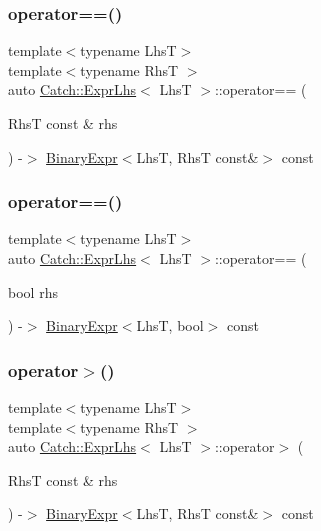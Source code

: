 \subsubsection{\texorpdfstring{operator==()}{operator==()}\hspace{0.1cm}{\footnotesize\ttfamily [1/2]}}
{\footnotesize\ttfamily template$<$typename LhsT$>$ \\
template$<$typename RhsT $>$ \\
auto \mbox{\hyperlink{class_catch_1_1_expr_lhs}{Catch\+::\+Expr\+Lhs}}$<$ LhsT $>$\+::operator== (\begin{DoxyParamCaption}\item[{RhsT const \&}]{rhs }\end{DoxyParamCaption}) -\/$>$ \mbox{\hyperlink{class_catch_1_1_binary_expr}{Binary\+Expr}}$<$LhsT, RhsT const\&$>$ const \hspace{0.3cm}{\ttfamily [inline]}}

\mbox{\label{class_catch_1_1_expr_lhs_ab707a84abdffbdc35962a495e238d393}} 
\subsubsection{\texorpdfstring{operator==()}{operator==()}\hspace{0.1cm}{\footnotesize\ttfamily [2/2]}}
{\footnotesize\ttfamily template$<$typename LhsT$>$ \\
auto \mbox{\hyperlink{class_catch_1_1_expr_lhs}{Catch\+::\+Expr\+Lhs}}$<$ LhsT $>$\+::operator== (\begin{DoxyParamCaption}\item[{bool}]{rhs }\end{DoxyParamCaption}) -\/$>$ \mbox{\hyperlink{class_catch_1_1_binary_expr}{Binary\+Expr}}$<$LhsT, bool$>$ const \hspace{0.3cm}{\ttfamily [inline]}}

\mbox{\label{class_catch_1_1_expr_lhs_a23cb0cd983a1ac9c3df5160542199b83}} 
\subsubsection{\texorpdfstring{operator$>$()}{operator>()}}
{\footnotesize\ttfamily template$<$typename LhsT$>$ \\
template$<$typename RhsT $>$ \\
auto \mbox{\hyperlink{class_catch_1_1_expr_lhs}{Catch\+::\+Expr\+Lhs}}$<$ LhsT $>$\+::operator$>$ (\begin{DoxyParamCaption}\item[{RhsT const \&}]{rhs }\end{DoxyParamCaption}) -\/$>$ \mbox{\hyperlink{class_catch_1_1_binary_expr}{Binary\+Expr}}$<$LhsT, RhsT const\&$>$ const \hspace{0.3cm}{\ttfamily [inline]}}

